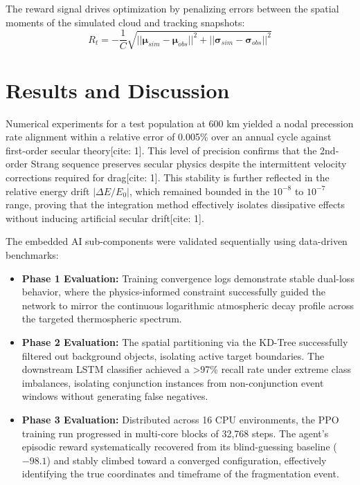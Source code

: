 \documentclass[conf]{AAS} %
\begin{document}
The reward signal drives optimization by penalizing errors between the spatial moments of the simulated cloud and tracking snapshots:
\begin{equation}
    R_t = - \frac{1}{C} \sqrt{ ||\boldsymbol{\mu}_{sim} - \boldsymbol{\mu}_{obs}||^2 + ||\boldsymbol{\sigma}_{sim} - \boldsymbol{\sigma}_{obs}||^2 }
\end{equation}

\section{Results and Discussion}
\label{sec:results_and_discussion}

Numerical experiments for a test population at 600 km yielded a nodal precession rate alignment within a relative error of 0.005\% over an annual cycle against first-order secular theory[cite: 1]. This level of precision confirms that the 2nd-order Strang sequence preserves secular physics despite the intermittent velocity corrections required for drag[cite: 1]. This stability is further reflected in the relative energy drift $|\Delta E/E_0|$, which remained bounded in the $10^{-8}$ to $10^{-7}$ range, proving that the integration method effectively isolates dissipative effects without inducing artificial secular drift[cite: 1].

The embedded AI sub-components were validated sequentially using data-driven benchmarks:
\begin{itemize}
    \item \textbf{Phase 1 Evaluation:} Training convergence logs demonstrate stable dual-loss behavior, where the physics-informed constraint successfully guided the network to mirror the continuous logarithmic atmospheric decay profile across the targeted thermospheric spectrum.
    \item \textbf{Phase 2 Evaluation:} The spatial partitioning via the KD-Tree successfully filtered out background objects, isolating active target boundaries. The downstream LSTM classifier achieved a >97\% recall rate under extreme class imbalances, isolating conjunction instances from non-conjunction event windows without generating false negatives.
    \item \textbf{Phase 3 Evaluation:} Distributed across 16 CPU environments, the PPO training run progressed in multi-core blocks of 32,768 steps. The agent's episodic reward systematically recovered from its blind-guessing baseline ($-98.1$) and stably climbed toward a converged configuration, effectively identifying the true coordinates and timeframe of the fragmentation event.
\end{itemize}
\end{document}
